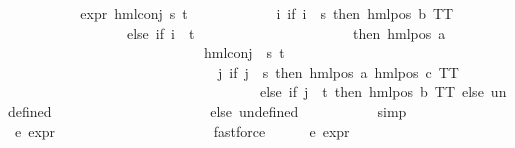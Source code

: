 \begin{isabellebody}
\ \ \ \ \isanewline
\ \ \ \ \isamarkupfalse%
\ {\isachardoublequoteopen}expr{\isacharunderscore}{\kern0pt}{}\ {\isacharparenleft}{\kern0pt}hml{\isacharunderscore}{\kern0pt}conj\ {\isacharbraceleft}{\kern0pt}s{\isacharcomma}{\kern0pt}\ t{\isacharbraceright}{\kern0pt}\ {\isacharbraceleft}{\kern0pt}{\isacharbraceright}{\kern0pt}\isanewline
\ \ \ \ \ \ \ \ \ \ \ {\isacharparenleft}{\kern0pt}{\isasymlambda}i{\isachardot}{\kern0pt}\ if\ i\ {\isacharequal}{\kern0pt}\ s\ then\ hml{\isacharunderscore}{\kern0pt}pos\ b\ TT\isanewline
\ \ \ \ \ \ \ \ \ \ \ \ \ \ \ \ \ else\ if\ i\ {\isacharequal}{\kern0pt}\ t\isanewline
\ \ \ \ \ \ \ \ \ \ \ \ \ \ \ \ \ \ \ \ \ \ then\ hml{\isacharunderscore}{\kern0pt}pos\ a\isanewline
\ \ \ \ \ \ \ \ \ \ \ \ \ \ \ \ \ \ \ \ \ \ \ \ \ \ \ \ {\isacharparenleft}{\kern0pt}hml{\isacharunderscore}{\kern0pt}conj\ {\isacharbraceleft}{\kern0pt}{\isacharbraceright}{\kern0pt}\ {\isacharbraceleft}{\kern0pt}s{\isacharcomma}{\kern0pt}\ t{\isacharbraceright}{\kern0pt}\isanewline
\ \ \ \ \ \ \ \ \ \ \ \ \ \ \ \ \ \ \ \ \ \ \ \ \ \ \ \ \ \ {\isacharparenleft}{\kern0pt}{\isasymlambda}j{\isachardot}{\kern0pt}\ if\ j\ {\isacharequal}{\kern0pt}\ s\ then\ hml{\isacharunderscore}{\kern0pt}pos\ a\ {\isacharparenleft}{\kern0pt}hml{\isacharunderscore}{\kern0pt}pos\ c\ TT{\isacharparenright}{\kern0pt}\isanewline
\ \ \ \ \ \ \ \ \ \ \ \ \ \ \ \ \ \ \ \ \ \ \ \ \ \ \ \ \ \ \ \ \ \ \ \ else\ if\ j\ {\isacharequal}{\kern0pt}\ t\ then\ hml{\isacharunderscore}{\kern0pt}pos\ b\ TT\ else\ undefined{\isacharparenright}{\kern0pt}{\isacharparenright}{\kern0pt}\isanewline
\ \ \ \ \ \ \ \ \ \ \ \ \ \ \ \ \ \ \ \ \ \ else\ undefined{\isacharparenright}{\kern0pt}{\isacharparenright}{\kern0pt}\ {\isacharequal}{\kern0pt}\ {}{\isachardoublequoteclose}\ \isanewline
\ \ \ \ \ \ \isamarkupfalse%
\ simp\isanewline
\ \ \ \ \isamarkupfalse%
\ e{}{\isacharcolon}{\kern0pt}\ {\isachardoublequoteopen}expr{\isacharunderscore}{\kern0pt}{}\ {\isasymphi}\ {\isacharequal}{\kern0pt}\ {}{\isachardoublequoteclose}\ \ \isanewline
\ \ \ \ \ \ \isamarkupfalse%
\ {\isasymphi}\ \isanewline
\ \ \ \ \ \ \isamarkupfalse%
\ fastforce\isanewline
\isanewline
\ \ \ \ \isamarkupfalse%
\ e{}{\isacharcolon}{\kern0pt}\ {\isachardoublequoteopen}expr{\isacharunderscore}{\kern0pt}{}\ {\isasymphi}\ {\isacharequal}{\kern0pt}\ {}{\isachardoublequoteclose}\ \isanewline
\ \ \ \ \ \ \isamarkupfalse%

\end{isabellebody}
